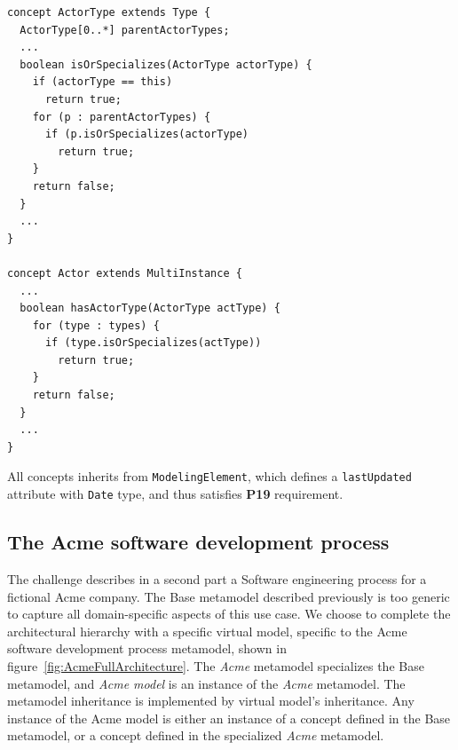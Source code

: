 \begin{lstlisting}
concept ActorType extends Type {
  ActorType[0..*] parentActorTypes;
  ...
  boolean isOrSpecializes(ActorType actorType) {    
    if (actorType == this)   
      return true;      
    for (p : parentActorTypes) {      
      if (p.isOrSpecializes(actorType)
        return true;
    }
    return false;
  }
  ...
}

concept Actor extends MultiInstance {
  ...
  boolean hasActorType(ActorType actType) {      
    for (type : types) {
      if (type.isOrSpecializes(actType))
        return true;
    }
    return false;
  }     
  ...
}
\end{lstlisting}

All concepts inherits from \texttt{ModelingElement}, which defines a \texttt{lastUpdated} attribute with \texttt{Date} type, and thus satisfies \textbf{P19} requirement. 

\subsection{The Acme software development process}
\label{sec:AcmeSoftwareDevelopmentProcess}

The challenge describes in a second part a Software engineering process for a fictional Acme company. The Base metamodel described previously is too generic to capture all domain-specific aspects of this use case. We choose to complete the architectural hierarchy with a specific virtual model, specific to the Acme software development process metamodel, shown in figure~\ref{fig:AcmeFullArchitecture}. 
The \textit{Acme} metamodel specializes the Base metamodel, and \textit{Acme model} is an instance of the \textit{Acme} metamodel. The metamodel inheritance is implemented by virtual model's inheritance. Any instance of the Acme model is either an instance of a concept defined in the Base metamodel, or a concept defined in the specialized \textit{Acme} metamodel.


